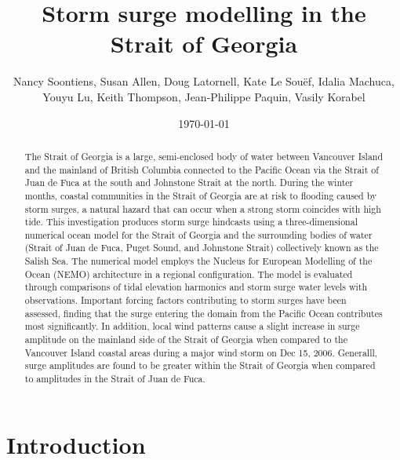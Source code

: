 \documentclass[pdftex,10pt]{article}
\title{Storm surge modelling in the Strait of Georgia}
\author{Nancy Soontiens, Susan Allen, Doug Latornell, Kate Le Sou\"{e}f, Idalia Machuca,
\\ Youyu Lu, Keith Thompson, Jean-Philippe Paquin, Vasily Korabel}
\date{\today}
\begin{document}
\maketitle

\begin{abstract}
The Strait of Georgia is a large, semi-enclosed body of water between Vancouver Island and the mainland of British Columbia connected to the Pacific Ocean via the Strait of Juan de Fuca at the south and Johnstone Strait at the north. During the winter months, coastal communities in the Strait of Georgia are at risk to flooding caused by storm surges, a natural hazard that can occur when a strong storm coincides with high tide. This investigation produces storm surge hindcasts using a three-dimensional numerical ocean model for the Strait of Georgia and the surrounding bodies of water (Strait of Juan de Fuca, Puget Sound, and Johnstone Strait) collectively known as the Salish Sea. The numerical model employs the Nucleus for European Modelling of the Ocean (NEMO) architecture in a regional configuration. The model is evaluated through comparisons of tidal elevation harmonics and storm surge water levels with observations. Important forcing factors contributing to storm surges have been assessed, finding that the surge entering the domain from the Pacific Ocean contributes most significantly. In addition, local wind patterns cause a slight increase in surge amplitude on the mainland side of the Strait of Georgia when compared to the Vancouver Island coastal areas during a major wind storm on Dec 15, 2006. Generalll, surge amplitudes are found to be greater within the Strait of Georgia when compared to amplitudes in the Strait of Juan de Fuca. 
\end{abstract}

\section{Introduction}\label{sec:intro}
\end{document}
